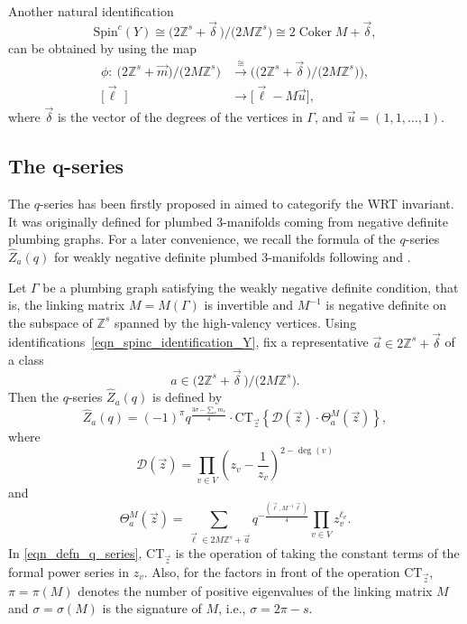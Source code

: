 \documentclass[11pt]{article}
\numberwithin{equation}{section}
\numberwithin{equation}{section}
\begin{document}
Another natural identification
\begin{equation}\label{eqn_spinc_identification_Y}
	\text{Spin}^c(Y)\cong \big(2\mathbb{Z}^s+\vec{\delta}\,\big)/\big(2M\mathbb{Z}^s\big) \cong 2\operatorname{Coker}M+\vec{\delta},
\end{equation}
can be obtained by using the map
\[
\begin{split}
	\phi\colon \ \big(2\mathbb{Z}^s+\vec{m}\big)/\big(2M\mathbb{Z}^s\big) & \xrightarrow{\cong} \big(\big(2\mathbb{Z}^s+\vec{\delta}\,\big)/\big(2M\mathbb{Z}^s\big)\big),\\
	\big[\vec{\ell}\,\,\big] & \rightarrow \big[\vec{\ell}-M\vec{u}\big],
\end{split}
\]
where $ \vec{\delta} $ is the vector of the degrees of the vertices in $ \Gamma $, and $ \vec{u}=(1,1,\dots,1) $.

\subsection[The q-series]{The $\boldsymbol{q}$-series}

The $ q $-series has been firstly proposed in \cite{gppv} aimed to categorify the WRT invariant. It was originally defined for plumbed 3-manifolds coming from negative definite plumbing graphs. For a later convenience, we recall the formula of the $ q $-series $ \hat{Z}_a(q) $ for weakly negative definite plumbed 3-manifolds following \cite{gukov} and \cite{gppv}.

Let $ \Gamma $ be a plumbing graph satisfying the weakly negative definite condition, that is, the linking matrix $ M=M(\Gamma) $ is invertible and $ M^{-1} $ is negative definite on the subspace of $\mathbb{Z}^s$ spanned by the high-valency vertices. Using identifications~\eqref{eqn_spinc_identification_Y}, fix a representative $ \vec{a}\in 2\mathbb{Z}^s+\vec{\delta} $ of a class
\[
a\in \big(2\mathbb{Z}^s+\vec{\delta}\,\big)/\big(2M\mathbb{Z}^s\big).
\]
Then the $ q $-series $ \hat{Z}_a(q) $ is defined by
\begin{equation}\label{eqn_defn_q_series}
	\hat{Z}_a(q)=(-1)^{\pi}  q^{\frac{3\sigma-\sum_v m_v}{4}} \cdot \text{CT}_{\vec{z}}\left\{ \mathcal{D}(\vec{z}) \cdot \Theta_a^{M}(\vec{z})\right\},
\end{equation}
where
\begin{equation}\label{eqn_defn_discriminant_q_series}
	\mathcal{D}(\vec{z})=\prod_{v\in V} \left(z_v-\frac{1}{z_v}\right)^{2-\deg(v)}
\end{equation}
and
\begin{equation}\label{eqn_defn_Theta_function_q_series}
	\Theta_a^{M}(\vec{z})=\sum_{\vec{\ell}\in 2M\mathbb{Z}^s+\vec{a}} q^{-\frac{(\vec{\ell},M^{-1}\vec{\ell})}{4}} \prod_{v\in V} z_v^{\ell_v}.
\end{equation}
In \eqref{eqn_defn_q_series}, $ \text{CT}_{\vec{z}}$ is the operation of taking the constant terms of the formal power series in $z_v$. Also, for the factors in front of the operation $ \text{CT}_{\vec{z}}$, $ \pi=\pi(M) $ denotes the number of positive eigenvalues of the linking matrix $ M $ and $ \sigma=\sigma(M) $ is the signature of $ M $, i.e., $ \sigma=2\pi-s $.
\end{document}
